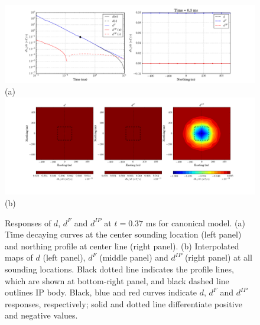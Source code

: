 \documentclass[a4paper, 11pt]{article}
\begin{document}
\begin{figure}[htb]
  \centering
  \includegraphics[height=0.2\textheight]{figures/synthetic/EMIPCase1_ch20_profile.png} \\ (a)
  \\
  \includegraphics[height=0.25\textheight]{figures/synthetic/EMIPCase1_ch20_plan.png} \\ (b)
  \caption{Responses of $d$, $d^{F}$ and $d^{IP}$ at $t=0.37$ ms for canonical model. (a) Time decaying curves at the center sounding location (left panel) and northing profile at center line (right panel). (b) Interpolated maps of $d$ (left panel), $d^{F}$ (middle panel) and $d^{IP}$ (right panel) at all sounding locations. Black dotted line indicates the profile lines, which are shown at bottom-right panel, and black dashed line outlines IP body. Black, blue and red curves indicate $d$, $d^{F}$ and $d^{IP}$responses, respectively; solid and dotted line differentiate positive and negative values. }
  \label{F: EMIPresp1_case1}
\end{figure}
\end{document}
